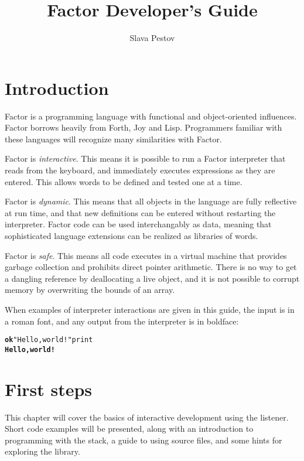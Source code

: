 \documentclass[english]{book}
\begin{document}
\title{Factor Developer's Guide}


\author{Slava Pestov}

\maketitle
\tableofcontents{}

\chapter*{Introduction}

Factor is a programming language with functional and object-oriented
influences. Factor borrows heavily from Forth, Joy and Lisp. Programmers familiar with these languages will recognize many similarities with Factor.

Factor is \emph{interactive}. This means it is possible to run a Factor interpreter that reads from the keyboard, and immediately executes expressions as they are entered. This allows words to be defined and tested one at a time.

Factor is \emph{dynamic}. This means that all objects in the language are fully reflective at run time, and that new definitions can be entered without restarting the interpreter. Factor code can be used interchangably as data, meaning that sophisticated language extensions can be realized as libraries of words.

Factor is \emph{safe}. This means all code executes in a virtual machine that provides
garbage collection and prohibits direct pointer arithmetic. There is no way to get a dangling reference by deallocating a live object, and it is not possible to corrupt memory by overwriting the bounds of an array.

When examples of interpreter interactions are given in this guide, the input is in a roman font, and any
output from the interpreter is in boldface:

\begin{alltt}
\textbf{ok} "Hello, world!" print
\textbf{Hello, world!}
\end{alltt}

\chapter{First steps}

This chapter will cover the basics of interactive development using the listener. Short code examples will be presented, along with an introduction to programming with the stack, a guide to using source files, and some hints for exploring the library.
\end{document}
